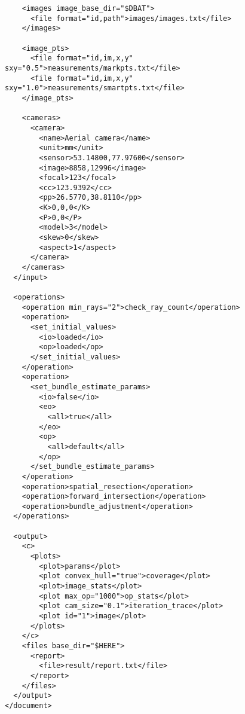 \documentclass{article}
\begin{document}
\begin{verbatim}
    <images image_base_dir="$DBAT">
      <file format="id,path">images/images.txt</file>
    </images>

    <image_pts>
      <file format="id,im,x,y" sxy="0.5">measurements/markpts.txt</file>
      <file format="id,im,x,y" sxy="1.0">measurements/smartpts.txt</file>
    </image_pts>

    <cameras>
      <camera>
        <name>Aerial camera</name>
        <unit>mm</unit>
        <sensor>53.14800,77.97600</sensor>
        <image>8858,12996</image>
        <focal>123</focal>
        <cc>123.9392</cc>
        <pp>26.5770,38.8110</pp>
        <K>0,0,0</K>
        <P>0,0</P>
        <model>3</model>
        <skew>0</skew>
        <aspect>1</aspect>
      </camera>
    </cameras>
  </input>

  <operations>
    <operation min_rays="2">check_ray_count</operation>
    <operation>
      <set_initial_values>
        <io>loaded</io>
        <op>loaded</op>
      </set_initial_values>
    </operation>
    <operation>
      <set_bundle_estimate_params>
        <io>false</io>
        <eo>
          <all>true</all>
        </eo>
        <op>
          <all>default</all>
        </op>
      </set_bundle_estimate_params>
    </operation>
    <operation>spatial_resection</operation>
    <operation>forward_intersection</operation>
    <operation>bundle_adjustment</operation>
  </operations>

  <output>
    <c>
      <plots>
        <plot>params</plot>
        <plot convex_hull="true">coverage</plot>
        <plot>image_stats</plot>
        <plot max_op="1000">op_stats</plot>
        <plot cam_size="0.1">iteration_trace</plot>
        <plot id="1">image</plot>
      </plots>
    </c>
    <files base_dir="$HERE">
      <report>
        <file>result/report.txt</file>
      </report>
    </files>
  </output>
</document>
\end{verbatim}
\end{document}
